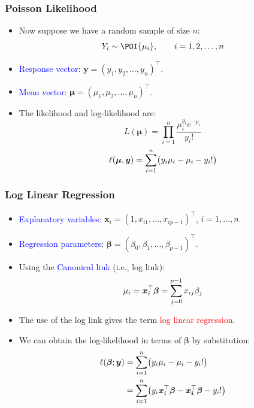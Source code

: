 \documentclass[oneside]{book}\usepackage[]{graphicx}\usepackage[svgnames]{xcolor}
\let\exp\relax%
\let\log\relax%
\providecommand{\Vector}[1]{\bm{#1}}%
\begin{document}
\subsubsection*{Poisson Likelihood}
\begin{itemize}
      \item Now suppose we have a random sample of size $ n $:
            \[ Y_i \sim \POI{\mu_i},\qquad i=1,2,\ldots,n \]
      \item \textcolor{Blue}{Response vector}: $ \Vector{y}=(y_1,y_2,\ldots,y_n)^\top $.
      \item \textcolor{Blue}{Mean vector}: $ \Vector{\mu}=(\mu_1,\mu_2,\ldots,\mu_n)^\top $.
      \item The likelihood and log-likelihood are:
            \[ L(\Vector{\mu})=\prod_{i=1}^n \frac{\mu_i^{y_i}e^{-\mu_i}}{y_i!}  \]
            \[ \ell(\Vector{\mu},\Vector{y})=\sum_{i=1}^{n} \bigl(y_i\log{\mu_i}-\mu_i-\log{y_i!}\bigr) \]
\end{itemize}
\subsubsection*{Log Linear Regression}
\begin{itemize}
      \item \textcolor{Blue}{Explanatory variables}: $ \Vector{x}_i=(1,x_{i1},\ldots,x_{ip-1})^\top $, $ i=1,\ldots,n $.
      \item \textcolor{Blue}{Regression parameters}: $ \Vector{\beta}=(\beta_0,\beta_1,\ldots,\beta_{p-1})^\top $.
      \item Using the \textcolor{Blue}{Canonical link} (i.e., log link):
            \[ \log{\mu_i}=\Vector{x}_i^\top \Vector{\beta}=\sum_{j=0}^{p-1} x_{ij}\beta_j \]
      \item The use of the log link gives the term \textcolor{Red}{log linear regression}.
      \item We can obtain the log-likelihood in terms of $ \Vector{\beta} $ by substitution:
            \begin{align*}
                  \ell(\Vector{\beta};\Vector{y})
                   & =\sum_{i=1}^{n} \bigl(y_i\log{\mu}_i-\mu_i-\log{y_i!}\bigr)                                                        \\
                   & =\sum_{i=1}^{n} \bigl(y_i \Vector{x}_i^\top \Vector{\beta}-\exp{\Vector{x_i}^\top \Vector{\beta}}-\log{y_i!}\bigr)
            \end{align*}
\end{itemize}
\end{document}
